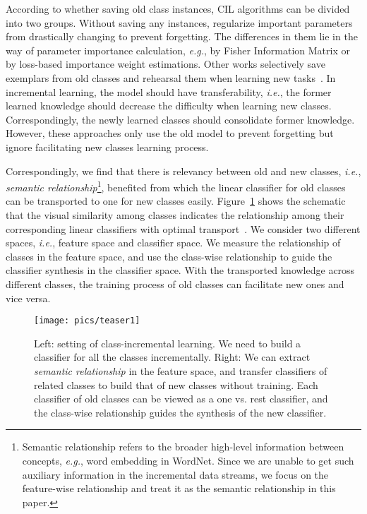 \documentclass[sigconf]{acmart}
\newcommand{\eg}{\emph{e.g.}}
\newcommand{\ie}{\emph{i.e.}}
\begin{document}
According to whether saving old class instances, CIL algorithms can be divided into two groups.
Without saving any instances, \cite{kirkpatrick2017overcoming,zenke2017continual,aljundi2018memory,lee2017overcoming} regularize important parameters from drastically changing to prevent forgetting. The differences in them lie in the way of parameter importance calculation, \eg, by Fisher Information Matrix or by loss-based importance weight estimations.
Other works selectively save exemplars from old classes and rehearsal them when learning new tasks~\cite{rebuffi2017icarl,IscenZLS20,xiang2019incremental}. 
In incremental learning, the model should have transferability, \ie, the former learned knowledge should decrease the difficulty when learning new classes. Correspondingly, the newly learned classes should consolidate former knowledge.  However, these approaches only use the old model to prevent forgetting but ignore  facilitating new classes learning process. 

Correspondingly, we find that there is relevancy between old and new classes, \ie, \emph{semantic relationship}\footnote{Semantic relationship refers to the broader high-level information between concepts, \eg, word embedding in WordNet. Since we are unable to get such auxiliary information in the incremental data streams, we focus on the feature-wise relationship and treat it as the semantic relationship in this paper.}, 
benefited from which the linear classifier for old classes can be transported to one for new classes easily.
Figure~\ref{figure:intro} shows the schematic that the visual similarity among classes indicates the relationship among their corresponding linear classifiers with optimal transport~\cite{villani2008optimal,kantorovich1960mathematical}. We consider two different spaces, \ie, feature space and classifier space. We measure the relationship of classes in the feature space, and use the class-wise relationship to guide the classifier synthesis in the classifier space.
With the transported knowledge across different classes, the training process of old classes can facilitate new ones and vice versa.

\begin{figure}[t]
	\begin{center}
		\texttt{[image: pics/teaser1]}
	\end{center}
	
	\vspace{-3mm}
	\caption{\small  Left: setting of class-incremental learning. 
		We need to build a classifier for all the classes incrementally.
		Right: We can extract \emph{semantic relationship} in the feature space, and transfer classifiers of related classes to build that of new classes without training. Each classifier of old classes can be viewed as a one vs. rest classifier, and the class-wise relationship guides the synthesis of the new classifier.
	} \label{figure:intro}
	\vspace{-3mm}
\end{figure}
\end{document}
